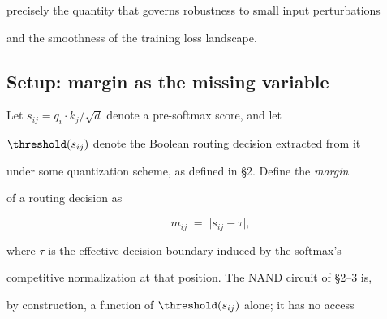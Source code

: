 precisely the quantity that governs robustness to small input perturbations





and the smoothness of the training loss landscape.











\subsection{Setup: margin as the missing variable}











Let $s_{ij} = q_i \cdot k_j / \sqrt{d}$ denote a pre-softmax score, and let





$\threshold(s_{ij})$ denote the Boolean routing decision extracted from it





under some quantization scheme, as defined in \S2. Define the \emph{margin}





of a routing decision as





\[





  m_{ij} \;=\; \bigl| s_{ij} - \tau \bigr|,





\]





where $\tau$ is the effective decision boundary induced by the softmax's





competitive normalization at that position. The NAND circuit of \S2--3 is,





by construction, a function of $\threshold(s_{ij})$ alone; it has no access





